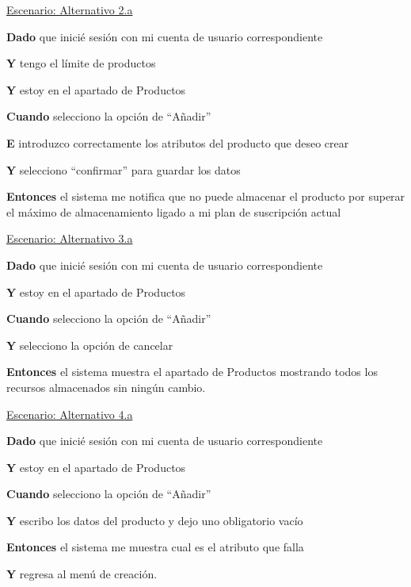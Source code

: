 \underline{Escenario: Alternativo 2.a}\par
\vspace{0.15cm}
\textbf{Dado} que inicié sesión con mi cuenta de usuario correspondiente\par
\textbf{Y} tengo el límite de productos\par
\textbf{Y} estoy en el apartado de Productos\par
\textbf{Cuando} selecciono la opción de “Añadir”\par
\textbf{E} introduzco correctamente los atributos del producto que deseo crear\par
\textbf{Y} selecciono “confirmar” para guardar los datos\par
\textbf{Entonces} el sistema me notifica que no puede almacenar el producto por superar el máximo de almacenamiento ligado a mi plan de suscripción actual\par
\vspace{0.20cm}

\underline{Escenario: Alternativo 3.a}\par
\vspace{0.15cm}
\textbf{Dado} que inicié sesión con mi cuenta de usuario correspondiente\par
\textbf{Y} estoy en el apartado de Productos\par
\textbf{Cuando} selecciono la opción de “Añadir”\par
\textbf{Y} selecciono la opción de cancelar\par
\textbf{Entonces} el sistema muestra el apartado de Productos mostrando todos los recursos almacenados sin ningún cambio.\par
\vspace{0.20cm}

\underline{Escenario: Alternativo 4.a}\par
\vspace{0.15cm}
\textbf{Dado} que inicié sesión con mi cuenta de usuario correspondiente\par
\textbf{Y} estoy en el apartado de Productos\par
\textbf{Cuando} selecciono la opción de “Añadir”\par
\textbf{Y} escribo los datos del producto y dejo uno obligatorio vacío\par
\textbf{Entonces} el sistema me muestra cual es el atributo que falla\par
\textbf{Y} regresa al menú de creación.\par
\vspace{0.20cm}

